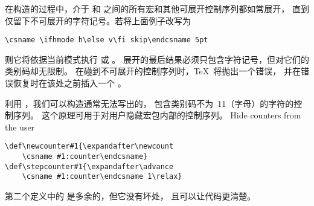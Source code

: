 \documentclass{book}
\begin{document}
在构造的过程中，介于  和 
之间的所有宏和其他可展开控制序列都如常展开，
直到仅留下不可展开的字符记号。若将上面例子改写为
\begin{verbatim}
\csname \ifhmode h\else v\fi skip\endcsname 5pt
\end{verbatim}
则它将依据当前模式执行  或 。
展开的最后结果必须只包含字符记号，但对它们的类别码却无限制。
在碰到不可展开的控制序列时，\TeX\ 将抛出一个错误，
并在错误恢复时在该处之前插入一个 。

利用 ，我们可以构造通常无法写出的，
包含类别码不为~11（字母）的字符的控制序列。
这个原理可用于对用户隐藏宏包内部的控制序列。
\howto Hide counters from the user\par
\begin{example}
\begin{verbatim}
\def\newcounter#1{\expandafter\newcount
    \csname #1:counter\endcsname}
\def\stepcounter#1{\expandafter\advance
    \csname #1:counter\endcsname 1\relax}
\end{verbatim}
第二个定义中的  是多余的，但它没有坏处，
且可以让代码更清楚。
\end{example}
\end{document}

